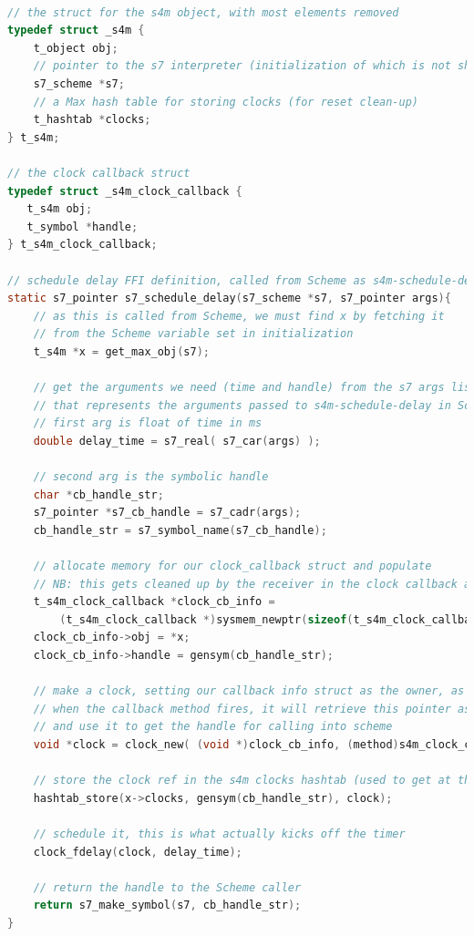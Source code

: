 \documentclass[acmsmall, anonymous, review]{acmart}
\begin{document}
\begin{lstlisting}[language=C]

// the struct for the s4m object, with most elements removed
typedef struct _s4m {
    t_object obj;
    // pointer to the s7 interpreter (initialization of which is not shown)
    s7_scheme *s7;
    // a Max hash table for storing clocks (for reset clean-up)
    t_hashtab *clocks;     
} t_s4m;

// the clock callback struct
typedef struct _s4m_clock_callback {
   t_s4m obj;
   t_symbol *handle; 
} t_s4m_clock_callback;

// schedule delay FFI definition, called from Scheme as s4m-schedule-delay
static s7_pointer s7_schedule_delay(s7_scheme *s7, s7_pointer args){
    // as this is called from Scheme, we must find x by fetching it
    // from the Scheme variable set in initialization
    t_s4m *x = get_max_obj(s7);

    // get the arguments we need (time and handle) from the s7 args list
    // that represents the arguments passed to s4m-schedule-delay in Scheme
    // first arg is float of time in ms 
    double delay_time = s7_real( s7_car(args) );

    // second arg is the symbolic handle
    char *cb_handle_str;
    s7_pointer *s7_cb_handle = s7_cadr(args);
    cb_handle_str = s7_symbol_name(s7_cb_handle);

    // allocate memory for our clock_callback struct and populate
    // NB: this gets cleaned up by the receiver in the clock callback above
    t_s4m_clock_callback *clock_cb_info = 
        (t_s4m_clock_callback *)sysmem_newptr(sizeof(t_s4m_clock_callback));
    clock_cb_info->obj = *x;
    clock_cb_info->handle = gensym(cb_handle_str);

    // make a clock, setting our callback info struct as the owner, as a void pointer
    // when the callback method fires, it will retrieve this pointer as an arg 
    // and use it to get the handle for calling into scheme  
    void *clock = clock_new( (void *)clock_cb_info, (method)s4m_clock_callback);

    // store the clock ref in the s4m clocks hashtab (used to get at them for reset cancelling) 
    hashtab_store(x->clocks, gensym(cb_handle_str), clock); 

    // schedule it, this is what actually kicks off the timer
    clock_fdelay(clock, delay_time);

    // return the handle to the Scheme caller
    return s7_make_symbol(s7, cb_handle_str);
}


\end{lstlisting}
\end{document}
